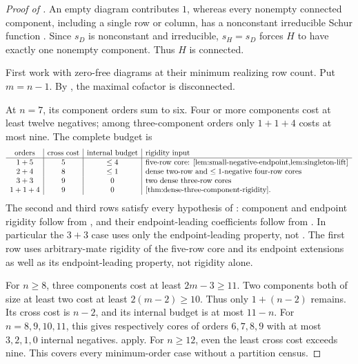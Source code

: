 \documentclass[11pt,a4paper]{amsart}
\numberwithin{equation}{section}
\theoremstyle{plain}
\theoremstyle{definition}
\begin{document}
\begin{proof}[Proof of ]
An empty diagram contributes \(1\), whereas every nonempty connected component, including a single row or column, has a nonconstant irreducible Schur function \cite{Barekat2009CoincidencesCorrigendum}.  Since \(s_D\) is nonconstant and irreducible, \(s_H=s_D\) forces \(H\) to have exactly one nonempty component.  Thus \(H\) is connected.

First work with zero-free diagrams at their minimum realizing row count.  Put \(m=n-1\).  By , the maximal cofactor is disconnected.

At \(n=7\), its component orders sum to six.  Four or more components cost at least twelve negatives; among three-component orders only \(1+1+4\) costs at most nine.  The complete budget is
\begin{equation}\label{eq:threshold-budget-table}
 \begin{array}{c|c|c|l}
 \text{orders}&\text{cross cost}&\text{internal budget}&\text{rigidity input}\\ \hline
 1+5&5&\le4&\text{five-row core: \Cref{lem:small-negative-endpoint,lem:singleton-lift}}\\
 2+4&8&\le1&\text{dense two-row and \(\le1\)-negative four-row cores}\\
 3+3&9&0&\text{two dense three-row cores}\\
 1+1+4&9&0&\Cref{thm:dense-three-component-rigidity}.
 \end{array}
\end{equation}
The second and third rows satisfy every hypothesis of : component and endpoint rigidity follow from , and their endpoint-leading coefficients follow from .  In particular the \(3+3\) case uses only the endpoint-leading property, not .  The first row uses arbitrary-mate rigidity of the five-row core and its endpoint extensions as well as its endpoint-leading property, not rigidity alone.

For \(n\ge8\), three components cost at least \(2m-3\ge11\).  Two components both of size at least two cost at least \(2(m-2)\ge10\).  Thus only \(1+(n-2)\) remains.  Its cross cost is \(n-2\), and its internal budget is at most \(11-n\).  For \(n=8,9,10,11\), this gives respectively cores of orders \(6,7,8,9\) with at most \(3,2,1,0\) internal negatives.   apply.  For \(n\ge12\), even the least cross cost exceeds nine.  This covers every minimum-order case without a partition census.


\end{proof}
\end{document}

